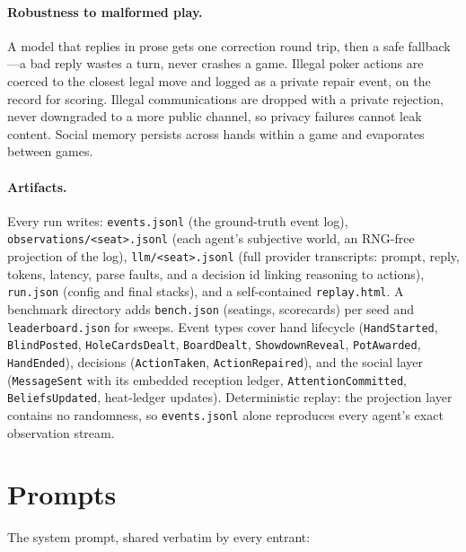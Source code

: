 \documentclass{article}
\begin{document}
\paragraph{Robustness to malformed play.} A model that replies in prose
gets one correction round trip, then a safe fallback---a bad reply wastes a
turn, never crashes a game. Illegal poker actions are coerced to the
closest legal move and logged as a private repair event, on the record for
scoring. Illegal communications are dropped with a private rejection, never
downgraded to a more public channel, so privacy failures cannot leak
content. Social memory persists across hands within a game and evaporates
between games.

\paragraph{Artifacts.} Every run writes: \texttt{events.jsonl} (the ground-truth event log),
\texttt{observations/<seat>.jsonl} (each agent's subjective world, an
RNG-free projection of the log), \texttt{llm/<seat>.jsonl} (full provider
transcripts: prompt, reply, tokens, latency, parse faults, and a decision
id linking reasoning to actions), \texttt{run.json} (config and final
stacks), and a self-contained \texttt{replay.html}. A benchmark directory
adds \texttt{bench.json} (seatings, scorecards) per seed and
\texttt{leaderboard.json} for sweeps. Event types cover hand lifecycle
(\texttt{HandStarted}, \texttt{BlindPosted}, \texttt{HoleCardsDealt},
\texttt{BoardDealt}, \texttt{ShowdownReveal}, \texttt{PotAwarded},
\texttt{HandEnded}), decisions (\texttt{ActionTaken},
\texttt{ActionRepaired}), and the social layer (\texttt{MessageSent} with
its embedded reception ledger, \texttt{AttentionCommitted},
\texttt{BeliefsUpdated}, heat-ledger updates). Deterministic replay: the
projection layer contains no randomness, so \texttt{events.jsonl} alone
reproduces every agent's exact observation stream.

\section{Prompts}
\label{app:prompts}

The system prompt, shared verbatim by every entrant:
\end{document}
